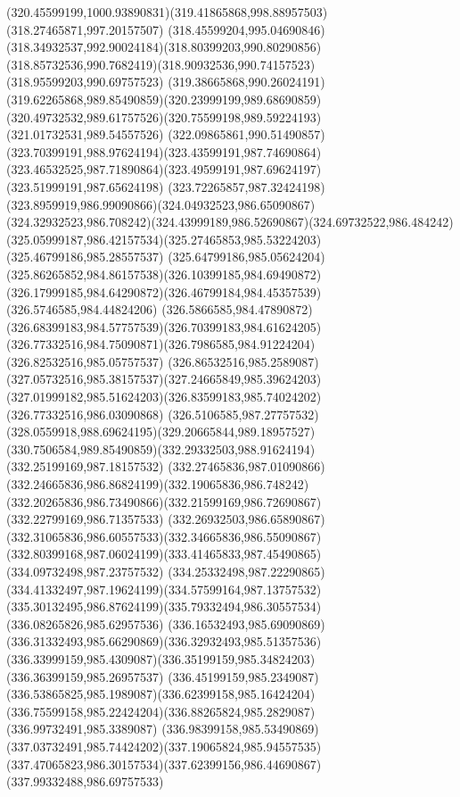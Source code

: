 {{\curveto(320.45599199,1000.93890831)(319.41865868,998.88957503)(318.27465871,997.20157507)
\curveto(318.45599204,995.04690846)(318.34932537,992.90024184)(318.80399203,990.80290856)
\curveto(318.85732536,990.7682419)(318.90932536,990.74157523)(318.95599203,990.69757523)
\curveto(319.38665868,990.26024191)(319.62265868,989.85490859)(320.23999199,989.68690859)
\curveto(320.49732532,989.61757526)(320.75599198,989.59224193)(321.01732531,989.54557526)
\curveto(322.09865861,990.51490857)(323.70399191,988.97624194)(323.43599191,987.74690864)
\curveto(323.46532525,987.71890864)(323.49599191,987.69624197)(323.51999191,987.65624198)
\curveto(323.72265857,987.32424198)(323.8959919,986.99090866)(324.04932523,986.65090867)
\curveto(324.32932523,986.708242)(324.43999189,986.52690867)(324.69732522,986.484242)
\curveto(325.05999187,986.42157534)(325.27465853,985.53224203)(325.46799186,985.28557537)
\curveto(325.64799186,985.05624204)(325.86265852,984.86157538)(326.10399185,984.69490872)
\curveto(326.17999185,984.64290872)(326.46799184,984.45357539)(326.5746585,984.44824206)
\curveto(326.5866585,984.47890872)(326.68399183,984.57757539)(326.70399183,984.61624205)
\curveto(326.77332516,984.75090871)(326.7986585,984.91224204)(326.82532516,985.05757537)
\curveto(326.86532516,985.2589087)(327.05732516,985.38157537)(327.24665849,985.39624203)
\curveto(327.01999182,985.51624203)(326.83599183,985.74024202)(326.77332516,986.03090868)
\curveto(326.5106585,987.27757532)(328.0559918,988.69624195)(329.20665844,989.18957527)
\curveto(330.7506584,989.85490859)(332.29332503,988.91624194)(332.25199169,987.18157532)
\curveto(332.27465836,987.01090866)(332.24665836,986.86824199)(332.19065836,986.748242)
\curveto(332.20265836,986.73490866)(332.21599169,986.72690867)(332.22799169,986.71357533)
\curveto(332.26932503,986.65890867)(332.31065836,986.60557533)(332.34665836,986.55090867)
\curveto(332.80399168,987.06024199)(333.41465833,987.45490865)(334.09732498,987.23757532)
\curveto(334.25332498,987.22290865)(334.41332497,987.19624199)(334.57599164,987.13757532)
\curveto(335.30132495,986.87624199)(335.79332494,986.30557534)(336.08265826,985.62957536)
\curveto(336.16532493,985.69090869)(336.31332493,985.66290869)(336.32932493,985.51357536)
\curveto(336.33999159,985.4309087)(336.35199159,985.34824203)(336.36399159,985.26957537)
\curveto(336.45199159,985.2349087)(336.53865825,985.1989087)(336.62399158,985.16424204)
\curveto(336.75599158,985.22424204)(336.88265824,985.2829087)(336.99732491,985.3389087)
\curveto(336.98399158,985.53490869)(337.03732491,985.74424202)(337.19065824,985.94557535)
\curveto(337.47065823,986.30157534)(337.62399156,986.44690867)(337.99332488,986.69757533)
}}

